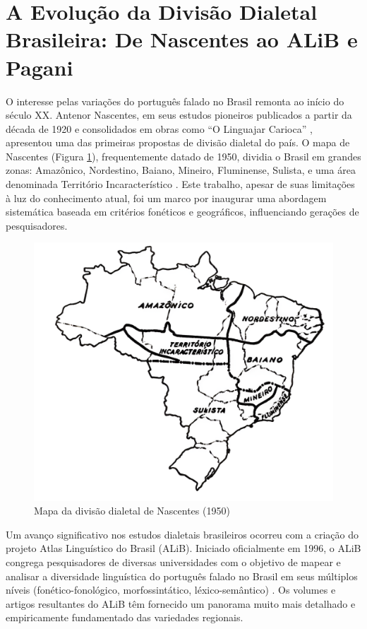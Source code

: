 \section{A Evolução da Divisão Dialetal Brasileira: De Nascentes ao ALiB e Pagani}


O interesse pelas variações do português falado no Brasil remonta ao início do século XX. Antenor Nascentes, em seus estudos pioneiros publicados a partir da década de 1920 e consolidados em obras como ``O Linguajar Carioca'' \cite{nascentes1953}, apresentou uma das primeiras propostas de divisão dialetal do país. O mapa de Nascentes (Figura \ref{fig:mapa1950}), frequentemente datado de 1950, dividia o Brasil em grandes zonas: Amazônico, Nordestino, Baiano, Mineiro, Fluminense, Sulista, e uma área denominada Território Incaracterístico \cite{nascentes1953}. Este trabalho, apesar de suas limitações à luz do conhecimento atual, foi um marco por inaugurar uma abordagem sistemática baseada em critérios fonéticos e geográficos, influenciando gerações de pesquisadores.



\begin{figure}[ht]
  \centering
  \includegraphics[width=0.75\linewidth]{images/mapa4x.png}
  \caption{Mapa da divisão dialetal de Nascentes (1950)}
  \label{fig:mapa1950}
\end{figure}
Um avanço significativo nos estudos dialetais brasileiros ocorreu com a criação do projeto Atlas Linguístico do Brasil (ALiB). Iniciado oficialmente em 1996, o ALiB congrega pesquisadores de diversas universidades com o objetivo de mapear e analisar a diversidade linguística do português falado no Brasil em seus múltiplos níveis (fonético-fonológico, morfossintático, léxico-semântico) \cite{cardoso2014alib, Aguilera2022}. Os volumes e artigos resultantes do ALiB têm fornecido um panorama muito mais detalhado e empiricamente fundamentado das variedades regionais.

